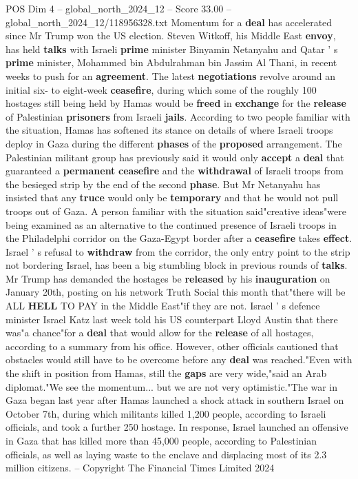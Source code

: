 \begin{textsample}{POS Dim 4 – global\_north\_2024\_12 – Score 33.00 – global\_north\_2024\_12/118956328.txt}
Momentum for a \textbf{deal} has accelerated since Mr Trump won the US election.
Steven Witkoff, his Middle East \textbf{envoy}, has held \textbf{talks} with Israeli \textbf{prime} minister Binyamin Netanyahu and Qatar ' s \textbf{prime} minister, Mohammed bin Abdulrahman bin Jassim Al Thani, in recent weeks to push for an \textbf{agreement}.
The latest \textbf{negotiations} revolve around an initial six- to eight-week \textbf{ceasefire}, during which some of the roughly 100 hostages still being held by Hamas would be \textbf{freed} in \textbf{exchange} for the \textbf{release} of Palestinian \textbf{prisoners} from Israeli \textbf{jails}.
According to two people familiar with the situation, Hamas has softened its stance on details of where Israeli troops deploy in Gaza during the different \textbf{phases} of the \textbf{proposed} arrangement.
The Palestinian militant group has previously said it would only \textbf{accept} a \textbf{deal} that guaranteed a \textbf{permanent} \textbf{ceasefire} and the \textbf{withdrawal} of Israeli troops from the besieged strip by the end of the second \textbf{phase}.
But Mr Netanyahu has insisted that any \textbf{truce} would only be \textbf{temporary} and that he would not pull troops out of Gaza.
A person familiar with the situation said"creative ideas"were being examined as an alternative to the continued presence of Israeli troops in the Philadelphi corridor on the Gaza-Egypt border after a \textbf{ceasefire} takes \textbf{effect}.
Israel ' s refusal to \textbf{withdraw} from the corridor, the only entry point to the strip not bordering Israel, has been a big stumbling block in previous rounds of \textbf{talks}.
Mr Trump has demanded the hostages be \textbf{released} by his \textbf{inauguration} on January 20th, posting on his network Truth Social this month that"there will be ALL \textbf{HELL} TO PAY in the Middle East"if they are not.
Israel ' s defence minister Israel Katz last week told his US counterpart Lloyd Austin that there was"a chance"for a \textbf{deal} that would allow for the \textbf{release} of all hostages, according to a summary from his office.
However, other officials cautioned that obstacles would still have to be overcome before any \textbf{deal} was reached."Even with the shift in position from Hamas, still the \textbf{gaps} are very wide,"said an Arab diplomat."We see the momentum... but we are not very optimistic."The war in Gaza began last year after Hamas launched a shock attack in southern Israel on October 7th, during which militants killed 1,200 people, according to Israeli officials, and took a further 250 hostage.
In response, Israel launched an offensive in Gaza that has killed more than 45,000 people, according to Palestinian officials, as well as laying waste to the enclave and displacing most of its 2.3 million citizens. -- Copyright The Financial Times Limited 2024


\end{textsample}

